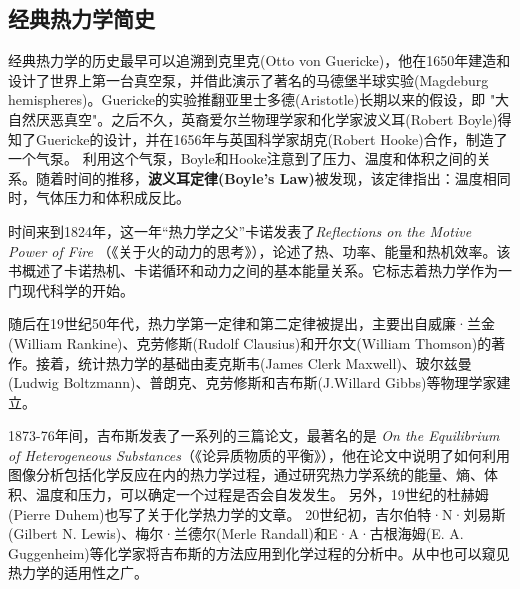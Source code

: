 \subsection{经典热力学简史}

\qquad 经典热力学的历史最早可以追溯到克里克(Otto von Guericke)，他在1650年建造和设计了世界上第一台真空泵，并借此演示了著名的马德堡半球实验(Magdeburg hemispheres)。Guericke的实验推翻亚里士多德(Aristotle)长期以来的假设，即 "大自然厌恶真空"。之后不久，英裔爱尔兰物理学家和化学家波义耳(Robert Boyle)得知了Guericke的设计，并在1656年与英国科学家胡克(Robert Hooke)合作，制造了一个气泵。\cite{partington1989short} 利用这个气泵，Boyle和Hooke注意到了压力、温度和体积之间的关系。随着时间的推移，\textbf{波义耳定律(Boyle's Law)}被发现，该定律指出：温度相同时，气体压力和体积成反比。

时间来到1824年，这一年“热力学之父”卡诺发表了\textit{Reflections on the Motive Power of Fire} （《关于火的动力的思考》），论述了热、功率、能量和热机效率。该书概述了卡诺热机、卡诺循环和动力之间的基本能量关系。它标志着热力学作为一门现代科学的开始。\cite{perrot1998z}

随后在19世纪50年代，热力学第一定律和第二定律被提出，主要出自威廉·兰金(William Rankine)、克劳修斯(Rudolf Clausius)和开尔文(William Thomson)的著作。接着，统计热力学的基础由麦克斯韦(James Clerk Maxwell)、玻尔兹曼(Ludwig Boltzmann)、普朗克、克劳修斯和吉布斯(J.Willard Gibbs)等物理学家建立。

1873-76年间，吉布斯发表了一系列的三篇论文，最著名的是\textit{ On the Equilibrium of Heterogeneous Substances}（《论异质物质的平衡》）\cite{connecticut1866transactions}，他在论文中说明了如何利用图像分析包括化学反应在内的热力学过程，通过研究热力学系统的能量、熵、体积、温度和压力，可以确定一个过程是否会自发发生。\cite{sugi1993scientific} 另外，19世纪的杜赫姆(Pierre Duhem)也写了关于化学热力学的文章\cite{duhem1886potentiel}。 20世纪初，吉尔伯特·N·刘易斯(Gilbert N. Lewis)、梅尔·兰德尔(Merle Randall)\cite{lewis1923thermodynamics}和E·A·古根海姆(E. A. Guggenheim)\cite{guggenheim2002modern,guggenheim1967advanced}等化学家将吉布斯的方法应用到化学过程的分析中。从中也可以窥见热力学的适用性之广。

